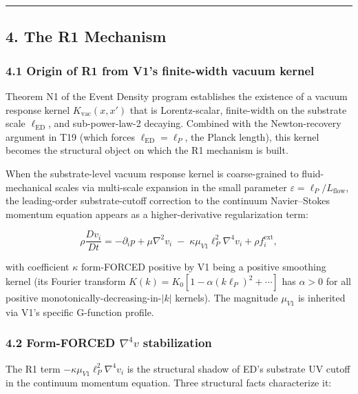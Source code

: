 \documentclass[
]{article}
\begin{document}
\begin{center}\rule{0.5\linewidth}{0.5pt}\end{center}

\subsection{4. The R1 Mechanism}\label{the-r1-mechanism}

\subsubsection{4.1 Origin of R1 from V1's finite-width vacuum
kernel}\label{origin-of-r1-from-v1s-finite-width-vacuum-kernel}

Theorem N1 of the Event Density program establishes the existence of a
vacuum response kernel \(K_\mathrm{vac}(x, x')\) that is Lorentz-scalar,
finite-width on the substrate scale \(\ell_\mathrm{ED}\), and
sub-power-law-2 decaying. Combined with the Newton-recovery argument in
T19 (which forces \(\ell_\mathrm{ED} = \ell_P\), the Planck length),
this kernel becomes the structural object on which the R1 mechanism is
built.

When the substrate-level vacuum response kernel is coarse-grained to
fluid-mechanical scales via multi-scale expansion in the small parameter
\(\varepsilon = \ell_P / L_\mathrm{flow}\), the leading-order
substrate-cutoff correction to the continuum Navier--Stokes momentum
equation appears as a higher-derivative regularization term:

\[\rho \frac{D v_i}{Dt} = -\partial_i p + \mu \nabla^2 v_i \;-\; \kappa \mu_{V1} \ell_P^2 \nabla^4 v_i + \rho f_i^\mathrm{ext},\]

with coefficient \(\kappa\) form-FORCED positive by V1 being a positive
smoothing kernel (its Fourier transform
\(\hat K(k) = K_0[1 - \alpha (k\ell_P)^2 + \cdots]\) has \(\alpha > 0\)
for all positive monotonically-decreasing-in-\(|k|\) kernels). The
magnitude \(\mu_{V1}\) is inherited via V1's specific G-function
profile.

\subsubsection{\texorpdfstring{4.2 Form-FORCED \(\nabla^4 v\)
stabilization}{4.2 Form-FORCED \textbackslash nabla\^{}4 v stabilization}}\label{form-forced-nabla4-v-stabilization}

The R1 term \(-\kappa \mu_{V1} \ell_P^2 \nabla^4 v_i\) is the structural
shadow of ED's substrate UV cutoff in the continuum momentum equation.
Three structural facts characterize it:
\end{document}
